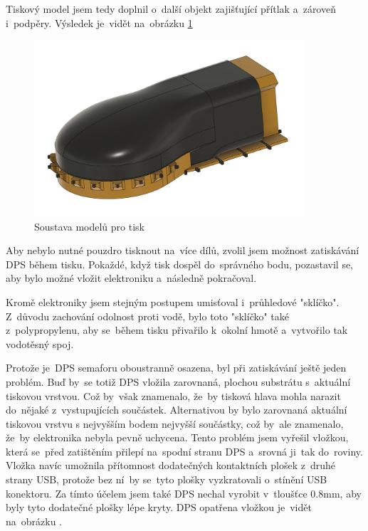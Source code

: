 Tiskový model jsem tedy doplnil o~další objekt zajišťující přítlak a~zároveň i~podpěry.
Výsledek je~vidět na~obrázku \ref{Semisemafor-box-pritlak}

\begin{figure}[!h]
  \centering
  \includegraphics[width=0.9\textwidth]{text/PraktickaCast/img/Semisemafor-BOX-pritlak.png}
  \caption{Soustava modelů pro tisk}
  \label{Semisemafor-box-pritlak}
\end{figure}

Aby nebylo nutné pouzdro tisknout na~více dílů, zvolil jsem možnost zatiskávání DPS během tisku.
Pokaždé, když tisk dospěl do~správného bodu, pozastavil se, aby bylo možné vložit elektroniku a~následně pokračoval.

Kromě elektroniky jsem stejným postupem umisťoval i~průhledové "sklíčko".
Z~důvodu zachování odolnost proti vodě, bylo toto "sklíčko" také z~polypropylenu, aby se~během tisku přivařilo k~okolní hmotě a~vytvořilo tak vodotěsný spoj.

Protože je~DPS semaforu oboustranně osazena, byl při zatiskávání ještě jeden problém.
Buď by~se totiž DPS vložila zarovnaná, plochou substrátu s~aktuální tiskovou vrstvou.
Což by~však znamenalo, že~by tisková hlava mohla narazit do~nějaké z~vystupujících součástek.
Alternativou by bylo zarovnaná aktuální tiskovou vrstvu s nejvyšším bodem nejvyšší součástky, což by~ale znamenalo, že~by elektronika nebyla pevně uchycena.
Tento problém jsem vyřešil vložkou, která se~před zatištěním přilepí na~spodní stranu DPS a~srovná ji~tak do~roviny.
Vložka navíc umožnila přítomnost dodatečných kontaktních plošek z~druhé strany USB, protože bez ní~by se~tyto plošky vyzkratovali o~stínění USB konektoru.
Za tímto účelem jsem také DPS nechal vyrobit v~tloušťce 0.8mm, aby byly tyto dodatečné plošky lépe kryty. 
DPS opatřena vložkou je~vidět na~obrázku .

